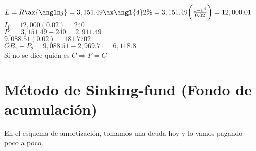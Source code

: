  $L= R\ax{\angln j} = 3,151.49\ax{\angl{4}2\%} = 3,151.49\bigg(\frac{1-v^4}{0.02}\bigg) = 12,000.01$\\

 $I_1 = 12,000(0.02) = 240$\\

 $P_1 = 3,151.49 - 240 = 2,911.49$\\

 $9,088.51(0.02) = 181.7702$\\

 $OB_1 - P_2 = 9,088.51 - 2,969.71 = 6,118.8$\\

Si no se dice quién es $C \Rightarrow F=C$

\section*{Método de Sinking-fund (Fondo de acumulación)}
En el esquema de amortización, tomamos una deuda hoy y lo vamos pagando poco a poco.


